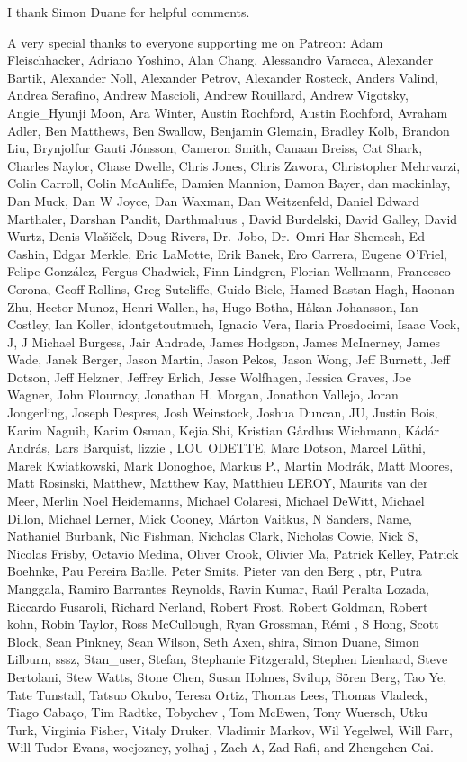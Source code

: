 \documentclass[
  letterpaper,
  DIV=11,
  numbers=noendperiod]{scrartcl}
\begin{document}
I thank Simon Duane for helpful comments.

A very special thanks to everyone supporting me on Patreon: Adam
Fleischhacker, Adriano Yoshino, Alan Chang, Alessandro Varacca,
Alexander Bartik, Alexander Noll, Alexander Petrov, Alexander Rosteck,
Anders Valind, Andrea Serafino, Andrew Mascioli, Andrew Rouillard,
Andrew Vigotsky, Angie\_Hyunji Moon, Ara Winter, Austin Rochford, Austin
Rochford, Avraham Adler, Ben Matthews, Ben Swallow, Benjamin Glemain,
Bradley Kolb, Brandon Liu, Brynjolfur Gauti Jónsson, Cameron Smith,
Canaan Breiss, Cat Shark, Charles Naylor, Chase Dwelle, Chris Jones,
Chris Zawora, Christopher Mehrvarzi, Colin Carroll, Colin McAuliffe,
Damien Mannion, Damon Bayer, dan mackinlay, Dan Muck, Dan W Joyce, Dan
Waxman, Dan Weitzenfeld, Daniel Edward Marthaler, Darshan Pandit,
Darthmaluus , David Burdelski, David Galley, David Wurtz, Denis
Vlašiček, Doug Rivers, Dr.~Jobo, Dr.~Omri Har Shemesh, Ed Cashin, Edgar
Merkle, Eric LaMotte, Erik Banek, Ero Carrera, Eugene O'Friel, Felipe
González, Fergus Chadwick, Finn Lindgren, Florian Wellmann, Francesco
Corona, Geoff Rollins, Greg Sutcliffe, Guido Biele, Hamed Bastan-Hagh,
Haonan Zhu, Hector Munoz, Henri Wallen, hs, Hugo Botha, Håkan Johansson,
Ian Costley, Ian Koller, idontgetoutmuch, Ignacio Vera, Ilaria
Prosdocimi, Isaac Vock, J, J Michael Burgess, Jair Andrade, James
Hodgson, James McInerney, James Wade, Janek Berger, Jason Martin, Jason
Pekos, Jason Wong, Jeff Burnett, Jeff Dotson, Jeff Helzner, Jeffrey
Erlich, Jesse Wolfhagen, Jessica Graves, Joe Wagner, John Flournoy,
Jonathan H. Morgan, Jonathon Vallejo, Joran Jongerling, Joseph Despres,
Josh Weinstock, Joshua Duncan, JU, Justin Bois, Karim Naguib, Karim
Osman, Kejia Shi, Kristian Gårdhus Wichmann, Kádár András, Lars
Barquist, lizzie , LOU ODETTE, Marc Dotson, Marcel Lüthi, Marek
Kwiatkowski, Mark Donoghoe, Markus P., Martin Modrák, Matt Moores, Matt
Rosinski, Matthew, Matthew Kay, Matthieu LEROY, Maurits van der Meer,
Merlin Noel Heidemanns, Michael Colaresi, Michael DeWitt, Michael
Dillon, Michael Lerner, Mick Cooney, Márton Vaitkus, N Sanders, Name,
Nathaniel Burbank, Nic Fishman, Nicholas Clark, Nicholas Cowie, Nick S,
Nicolas Frisby, Octavio Medina, Oliver Crook, Olivier Ma, Patrick
Kelley, Patrick Boehnke, Pau Pereira Batlle, Peter Smits, Pieter van den
Berg , ptr, Putra Manggala, Ramiro Barrantes Reynolds, Ravin Kumar, Raúl
Peralta Lozada, Riccardo Fusaroli, Richard Nerland, Robert Frost, Robert
Goldman, Robert kohn, Robin Taylor, Ross McCullough, Ryan Grossman, Rémi
, S Hong, Scott Block, Sean Pinkney, Sean Wilson, Seth Axen, shira,
Simon Duane, Simon Lilburn, sssz, Stan\_user, Stefan, Stephanie
Fitzgerald, Stephen Lienhard, Steve Bertolani, Stew Watts, Stone Chen,
Susan Holmes, Svilup, Sören Berg, Tao Ye, Tate Tunstall, Tatsuo Okubo,
Teresa Ortiz, Thomas Lees, Thomas Vladeck, Tiago Cabaço, Tim Radtke,
Tobychev , Tom McEwen, Tony Wuersch, Utku Turk, Virginia Fisher, Vitaly
Druker, Vladimir Markov, Wil Yegelwel, Will Farr, Will Tudor-Evans,
woejozney, yolhaj , Zach A, Zad Rafi, and Zhengchen Cai.
\end{document}
